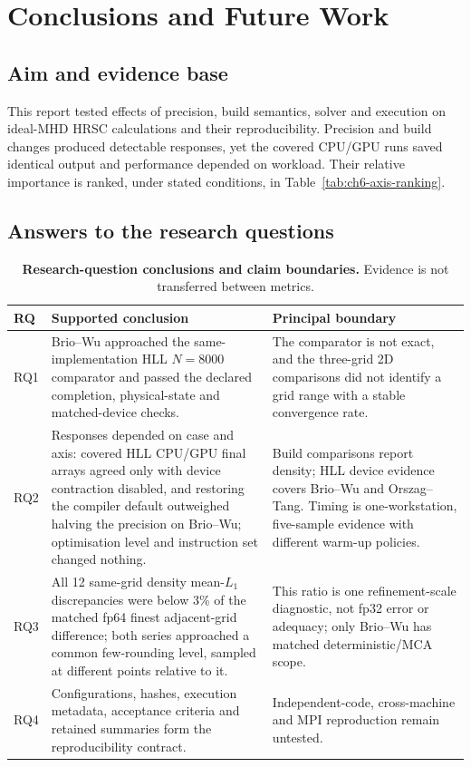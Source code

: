 
\chapter{Conclusions and Future Work}
\label{chap:conclusions}

\section{Aim and evidence base}

This report tested effects of precision, build semantics, solver and execution
on ideal-MHD HRSC calculations and their reproducibility.
Precision and build changes produced detectable responses, yet the covered
CPU/GPU runs saved identical output and performance depended on workload.
Their relative importance is ranked, under stated conditions, in
Table~\ref{tab:ch6-axis-ranking}.

\section{Answers to the research questions}

\begin{table}[H]
\centering
\small
\begin{tabularx}{\textwidth}{@{}p{}XX@{}}
\toprule
RQ & Supported conclusion & Principal boundary \\
\midrule
RQ1 & Brio--Wu approached the same-implementation HLL $N=8000$ comparator and
passed the declared completion, physical-state and matched-device checks. & The comparator
is not exact, and the three-grid 2D comparisons did not identify a grid range
with a stable convergence rate. \\
RQ2 & Responses depended on case and axis: covered HLL CPU/GPU final arrays
agreed only with device contraction disabled, and restoring the compiler
default outweighed halving the precision on Brio--Wu; optimisation level and
instruction set changed nothing. & Build comparisons report density;
HLL device evidence covers Brio--Wu and Orszag--Tang. Timing is one-workstation, five-sample
evidence with different warm-up policies. \\
RQ3 & All 12 same-grid density mean-$L_1$ discrepancies were below 3\% of the
matched fp64 finest adjacent-grid difference; both series approached a common
few-rounding level, sampled at different points relative to it. & This ratio
is one refinement-scale diagnostic,
not fp32 error or adequacy; only Brio--Wu has matched deterministic/MCA scope. \\
RQ4 & Configurations, hashes, execution metadata, acceptance criteria and retained summaries
form the reproducibility contract. & Independent-code, cross-machine and MPI
reproduction remain untested. \\
\bottomrule
\end{tabularx}
\caption[Research-question conclusions]{\textbf{Research-question conclusions
and claim boundaries.} Evidence is not transferred between metrics.}
\label{tab:ch7-conclusion-matrix}
\end{table}

